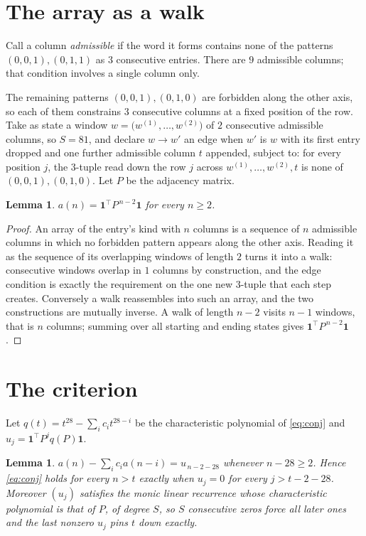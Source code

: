 \documentclass[11pt,a4paper]{article}
\theoremstyle{plain}
\newtheorem{lemma}[theorem]{Lemma}
\theoremstyle{definition}
\begin{document}
\section{The array as a walk}

Call a column \emph{admissible} if the word it forms contains none of the patterns
$(0,0,1), (0,1,1)$ as $3$ consecutive entries. There are $9$ admissible columns; that condition
involves a single column only.

The remaining patterns $(0,0,1), (0,1,0)$ are forbidden along the other axis, so each of them
constrains $3$ consecutive columns at a fixed position of the row. Take as state a
window $w=\bigl(w^{(1)},\dots,w^{(2)}\bigr)$ of $2$ consecutive admissible
columns, so $S=81$, and declare $w\to w'$ an edge when $w'$ is $w$ with its first entry
dropped and one further admissible column $t$ appended, subject to: for every position
$j$, the $3$-tuple read down the row $j$ across $w^{(1)},\dots,w^{(2)},t$
is none of $(0,0,1), (0,1,0)$. Let $P$ be the adjacency matrix.

\begin{lemma}\label{lem:walk}
$a(n)=\mathbf{1}^{\!\top}P^{\,n-2}\mathbf{1}$ for every $n\ge2$.
\end{lemma}

\begin{proof}
An array of the entry's kind with $n$ columns is a sequence of $n$ admissible columns in
which no forbidden pattern appears along the other axis. Reading it as the sequence of its
overlapping windows of length $2$ turns it into a walk: consecutive windows overlap in
$1$ columns by construction, and the edge condition is exactly the requirement on the one
new $3$-tuple that each step creates. Conversely a walk reassembles into such an array,
and the two constructions are mutually inverse. A walk of length $n-2$ visits $n-1$
windows, that is $n$ columns; summing over all starting and ending states gives
$\mathbf{1}^{\!\top}P^{\,n-2}\mathbf{1}$.
\end{proof}

\section{The criterion}

Let $q(t)=t^{28}-\sum_i c_i t^{28-i}$ be the characteristic polynomial of
\eqref{eq:conj} and $u_j=\mathbf{1}^{\!\top}P^{j}q(P)\mathbf{1}$.

\begin{lemma}\label{lem:crit}
$a(n)-\sum_i c_i a(n-i)=u_{\,n-2-28}$ whenever $n-28\ge2$. Hence
\eqref{eq:conj} holds for every $n>t$ exactly when $u_j=0$ for every
$j>t-2-28$. Moreover $(u_j)$ satisfies the monic linear recurrence whose
characteristic polynomial is that of $P$, of degree $S$, so $S$ consecutive zeros force all
later ones and the last nonzero $u_j$ pins $t$ down exactly.
\end{lemma}
\end{document}
